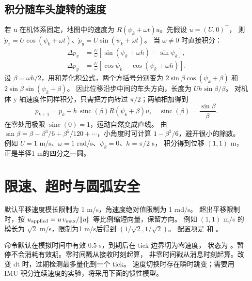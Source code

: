 \subsection*{积分随车头旋转的速度}
若 u 在机体系固定，地图中的速度为 $R(\psi_k+\omega t)u$。先假设 $u=(U,0)^\top$，
则 $\dot p_x=U\cos(\psi_k+\omega t)$、$\dot p_y=U\sin(\psi_k+\omega t)$。
当 $\omega\ne0$ 时直接积分：
\begin{align}
\Delta p_x&=\frac U\omega[\sin(\psi_k+\omega h)-\sin\psi_k],\\
\Delta p_y&=\frac U\omega[\cos\psi_k-\cos(\psi_k+\omega h)].
\end{align}
设 $\beta=\omega h/2$，用和差化积公式，两个方括号分别变为
$2\sin\beta\cos(\psi_k+\beta)$ 和 $2\sin\beta\sin(\psi_k+\beta)$。
因此位移沿步中间的车头方向，长度为 $Uh\sin\beta/\beta$。
对机体 y 轴速度作同样积分，只需把方向转过 $\pi/2$；两轴相加得到
\begin{equation}
p_{k+1}=p_k+h\,\operatorname{sinc}(\beta)R(\psi_k+\beta)u,
\quad \operatorname{sinc}(\beta)=\frac{\sin\beta}{\beta}.
\end{equation}
在零处用极限 $\operatorname{sinc}(0)=1$，运动自然变成直线。
由 $\sin\beta=\beta-\beta^3/6+\beta^5/120+\cdots$，小角度时可计算
$1-\beta^2/6$，避开很小的除数。
例如 $U=1$ m/s、$\omega=1$ rad/s、$\psi_k=0$、$h=\pi/2$ s，
积分得到位移 $(1,1)$ m，正是半径1 m的四分之一圆。

\par\noindent\begin{minipage}{\linewidth}

\end{minipage}\par

\section{限速、超时与圆弧安全}
默认平移速度模长限制为 1 m/s，角速度绝对值限制为 1 rad/s。
超出平移限制时，按 $u_{\rm applied}=u\,v_{\max}/\|u\|$ 等比例缩短向量，保留方向。
例如 $(1,1)$ m/s 的模长为 $\sqrt2$ m/s，限制为1 m/s后得到 $(1/\sqrt2,1/\sqrt2)$。
配置项是  和 。

命令默认在模拟时间中有效 0.5 s，到期后在 tick 边界切为零速度，
状态为 。暂停不会消耗有效期。零时间戳从接收时刻起算，
非零时间戳从消息时刻起算。改变 dt 时，过期检测最多量化到一个 tick。
速度切换时存在瞬时跳变；需要用 IMU 积分连续速度的实验，将采用下面的惯性模型。

